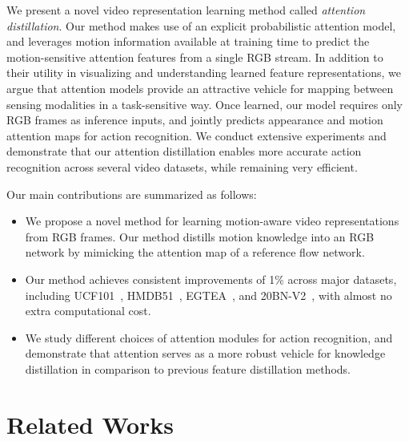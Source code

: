 \documentclass{bmvc2k}
\begin{document}
We present a novel video representation learning method called \emph{attention distillation}. Our method makes use of an explicit probabilistic attention model, and leverages motion information available at training time to predict the motion-sensitive attention features from a single RGB stream. In addition to their utility in visualizing and understanding learned feature representations, we argue that attention models provide an attractive vehicle for mapping between sensing modalities in a task-sensitive way. Once learned, our model requires only RGB frames as inference inputs, and jointly predicts appearance and motion attention maps for action recognition. We conduct extensive experiments and demonstrate that our attention distillation enables more accurate action recognition across several video datasets, while remaining very efficient. 


Our main contributions are summarized as follows: 
\begin{itemize}
    \item  We propose a novel method for learning motion-aware video representations from RGB frames. Our method distills motion knowledge into an RGB network by mimicking the attention map of a reference flow network. \vspace{-0.6em}
    \item Our method achieves consistent improvements of  1\% across major datasets, including UCF101~\cite{Soomro2012UCF101AD}, HMDB51~\cite{kuehne2011hmdb}, EGTEA~\cite{Li_2018_ECCV}, and 20BN-V2~\cite{mahdisoltani2018fine}, with almost no extra computational cost. \vspace{-0.6em}
    \item We study different choices of attention modules for action recognition, and demonstrate that attention serves as a more robust vehicle for knowledge distillation in comparison to previous feature distillation methods.\vspace{-0.6em}
\end{itemize}


\section{Related Works}
\end{document}
